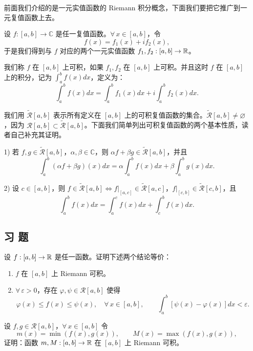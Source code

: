 前面我们介绍的是一元实值函数的 Riemann 积分概念，下面我们要把它推广到一元复值函数上去。

设 \(f:[a,b]\to\mathbb{C}\) 是任一复值函数。\(\forall\,x\in[a,b]\)，令
\[
f(x)=f_1(x)+if_2(x),
\]
于是我们得到与 \(f\) 对应的两个一元实值函数 \(f_1,f_2:[a,b]\to\mathbb{R}\)。

\begin{mydef*}{}

	我们称 \(f\) 在 \([a,b]\) 上可积，如果 \(f_1,f_2\) 在 \([a,b]\) 上可积。并且这时 \(f\) 在 \([a,b]\) 上的积分，记为 \(\displaystyle\int_a^b f(x)dx\)，定义为：
	\[
	\int_a^b f(x)dx=\int_a^b f_1(x)dx+i\int_a^b f_2(x)dx.
	\]

\end{mydef*}

我们用 \(\widetilde{\mathscr{R}}[a,b]\) 表示所有定义在 \([a,b]\) 上的可积复值函数的集合。\(\widetilde{\mathscr{R}}[a,b]\neq\varnothing\)，因为 \(\mathscr{R}[a,b]\subset\widetilde{\mathscr{R}}[a,b]\)。下面我们简单列出可积复值函数的两个基本性质，读者自己补充其证明。

1) 若 \(f,g\in\widetilde{\mathscr{R}}[a,b]\)，\(\alpha,\beta\in\mathbb{C}\)，则 \(\alpha f+\beta g\in\widetilde{\mathscr{R}}[a,b]\)，并且
\[
\int_a^b(\alpha f+\beta g)(x)dx=\alpha\int_a^b f(x)dx+\beta\int_a^b g(x)dx.
\]

2) 设 \(c\in[a,b]\)，则 \(f\in\widetilde{\mathscr{R}}[a,b]\Longleftrightarrow f|_{[a,c]}\in\widetilde{\mathscr{R}}[a,c]\)，\(f|_{[c,b]}\in\widetilde{\mathscr{R}}[c,b]\)，且
\[
\int_a^b f(x)dx=\int_a^c f(x)dx+\int_c^b f(x)dx.
\]

\subsection*{习 题}

\begin{exercise}
	\item 设 \(f:[a,b]\to\mathbb{R}\) 是任一函数。证明下述两个结论等价：
	\begin{enumerate}[label=\arabic*)]
		\item \(f\) 在 \([a,b]\) 上 Riemann 可积。
		\item \(\forall\,\varepsilon>0\)，存在 \(\varphi,\psi\in\mathscr{R}[a,b]\) 使得
		\[
		\varphi(x)\le f(x)\le\psi(x),\quad\forall\,x\in[a,b],\qquad\int_a^b[\psi(x)-\varphi(x)]dx<\varepsilon.
		\]
	\end{enumerate}
\end{exercise}

\begin{exercise}
	\item 设 \(f,g\in\mathscr{R}[a,b]\)，\(\forall\,x\in[a,b]\) 令
	\[
	m(x)=\min(f(x),g(x)),\qquad M(x)=\max(f(x),g(x)),
	\]
	证明：函数 \(m,M:[a,b]\to\mathbb{R}\) 在 \([a,b]\) 上 Riemann 可积。
\end{exercise}

